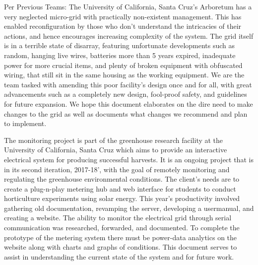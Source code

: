 
Per Previous Teams:
\newline
The University of California, Santa Cruz’s Arboretum has a very neglected
micro-grid with practically non-existent management. This has enabled reconﬁguration
by those who don’t understand the intricacies of their actions, and
hence encourages increasing complexity of the system. The grid itself is in a
terrible state of disarray, featuring unfortunate developments such as random,
hanging live wires, batteries more than 5 years expired, inadequate power for
more crucial items, and plenty of broken equipment with obfuscated wiring,
that still sit in the same housing as the working equipment. We are the team
tasked with amending this poor facility’s design once and for all, with great
advancements such as a completely new design, fool-proof safety, and guidelines
for future expansion. We hope this document elaborates on the dire need to
make changes to the grid as well as documents what changes we recommend
and plan to implement.
\newline

The monitoring project is part of the greenhouse research facility at the University of California, Santa
Cruz which aims to provide an interactive electrical system for producing successful harvests. It is an
ongoing project that is in its second iteration, 2017-18’, with the goal of remotely monitoring and
regulating the greenhouse environmental conditions. The client’s needs are to create a plug-n-play
metering hub and web interface for students to conduct horticulture experiments using solar energy.
This year’s productivity involved gathering old documentation, revamping the server, developing a usermanual,
and creating a website. The ability to monitor the electrical grid through serial communication
was researched, forwarded, and documented. To complete the prototype of the metering system there
must be power-data analytics on the website along with charts and graphs of conditions. This document
serves to assist in understanding the current state of the system and for future work.
